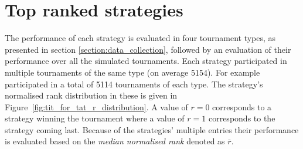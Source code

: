 \begin{table}[!htbp]
    \begin{center}
\end{center}
\caption{Output result of a single tournament.}\label{table:output_result}
\end{table}

\section{Top ranked strategies}\label{section:top_performances}

The performance of each strategy is evaluated in four tournament types, as
presented in section \ref{section:data_collection}, followed by an
evaluation of their performance over all the \numberofalltournaments simulated
tournaments. Each strategy participated in multiple tournaments of
the same type (on average 5154). For example \TitForTat participated in a
total of 5114 tournaments of each type. The strategy's normalised rank
distribution in these is given in Figure~\ref{fig:tit_for_tat_r_distribution}. A
value of \(r = 0\) corresponds to a strategy winning the tournament where a
value of \(r = 1\) corresponds to the strategy coming last. Because of the
strategies' multiple entries their performance is evaluated based on the
\textit{median normalised rank} denoted as \(\bar{r}\).

